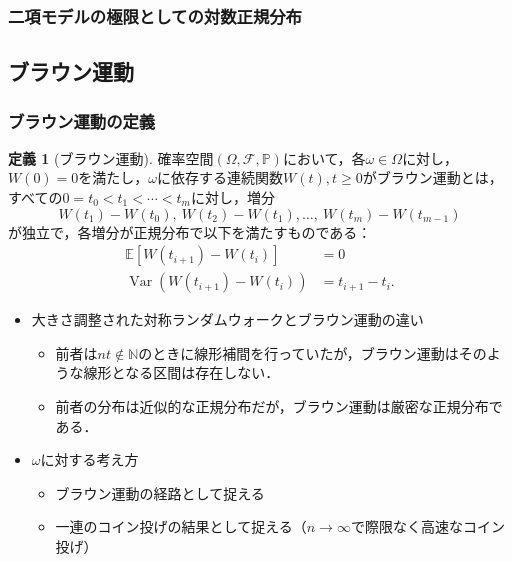 \documentclass[a4paper, lualatex, ja=standard]{bxjsarticle}
\theoremstyle{definition}
\newtheorem{dfn}[thm]{定義}
\begin{document}
\subsubsection{二項モデルの極限としての対数正規分布}


\subsection{ブラウン運動}
\subsubsection{ブラウン運動の定義}
\begin{dfn}[ブラウン運動]
  確率空間$(\Omega,\mathcal{F},\mathbb{P})$において，各$\omega\in\Omega$に対し，$W(0)=0$を満たし，$\omega$に依存する連続関数$W(t),t\geq0$がブラウン運動とは，すべての$0=t_0<t_1<\cdots<t_m$に対し，増分
  \begin{equation}
    W(t_1)-W(t_0),\ W(t_2)-W(t_1),\ldots,\ W(t_m)-W(t_{m-1})
    \label{eq:BrownianIncrements}
  \end{equation}
  が独立で，各増分が正規分布で以下を満たすものである：
  \begin{align}
    \mathbb{E}[W(t_{i+1})-W(t_i)] &= 0 \\
    \operatorname{Var}(W(t_{i+1})-W(t_i)) &= t_{i+1}-t_i.
  \end{align}
\end{dfn}
\begin{itemize}
  \item 大きさ調整された対称ランダムウォークとブラウン運動の違い
  \begin{itemize}
    \item 前者は$nt\not\in\mathbb{N}$のときに線形補間を行っていたが，ブラウン運動はそのような線形となる区間は存在しない．
    \item 前者の分布は近似的な正規分布だが，ブラウン運動は厳密な正規分布である．
  \end{itemize}
  \item $\omega$に対する考え方
  \begin{itemize}
    \item ブラウン運動の経路として捉える
    \item 一連のコイン投げの結果として捉える（$n\to\infty$で際限なく高速なコイン投げ）
  \end{itemize}
\end{itemize}
\end{document}
